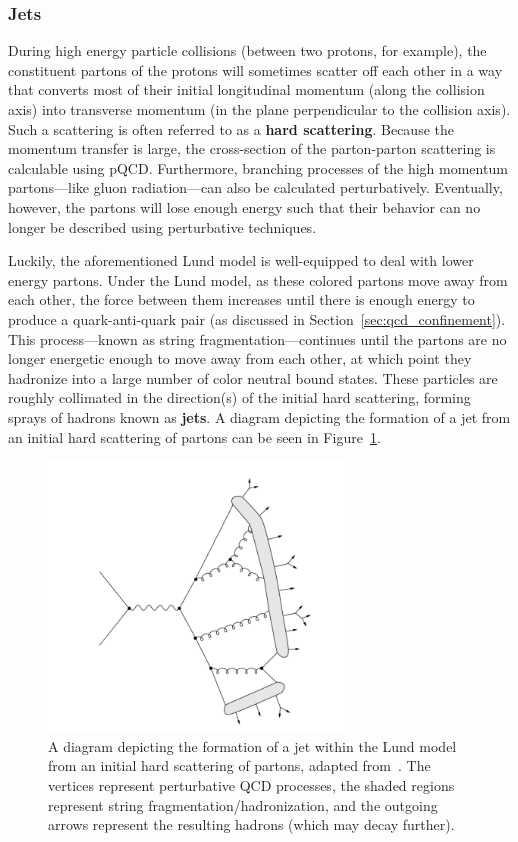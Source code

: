 \subsubsection{Jets}
\label{sec:jets}

During high energy particle collisions (between two protons, for example), the constituent partons of the protons will sometimes scatter off each other in a way that converts most of their initial longitudinal momentum (along the collision axis) into transverse momentum (in the plane perpendicular to the collision axis). Such a scattering is often referred to as a \textbf{hard scattering}. Because the momentum transfer is large, the cross-section of the parton-parton scattering is calculable using pQCD. Furthermore, branching processes of the high momentum partons---like gluon radiation---can also be calculated perturbatively. Eventually, however, the partons will lose enough energy such that their behavior can no longer be described using perturbative techniques.

Luckily, the aforementioned Lund model is well-equipped to deal with lower energy partons. Under the Lund model, as these colored partons move away from each other, the force between them increases until there is enough energy to produce a quark-anti-quark pair (as discussed in Section~\ref{sec:qcd_confinement}). This process---known as string fragmentation---continues until the partons are no longer energetic enough to move away from each other, at which point they hadronize into a large number of color neutral bound states. These particles are roughly collimated in the direction(s) of the initial hard scattering, forming sprays of hadrons known as \textbf{jets}. A diagram depicting the formation of a jet from an initial hard scattering of partons can be seen in Figure~\ref{fig:jet_diagram}. 

\begin{figure}[ht]
    \centering
    \includegraphics[width=0.7\textwidth]{figures/introduction/jet_string.png}
    \caption{A diagram depicting the formation of a jet within the Lund model from an initial hard scattering of partons, adapted from~\cite{JetStringDiagram}. The vertices represent perturbative QCD processes, the shaded regions represent string fragmentation/hadronization, and the outgoing arrows represent the resulting hadrons (which may decay further).}
    \label{fig:jet_diagram}
\end{figure}

